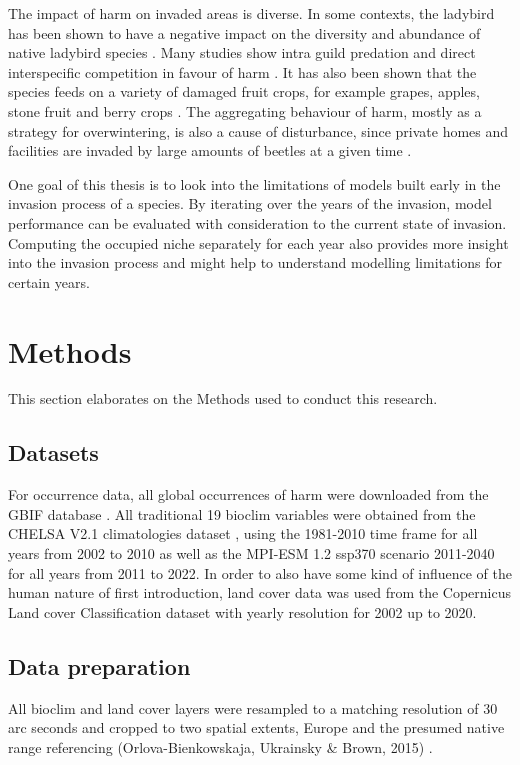 \documentclass[12pt,a4paper]{article}
\begin{document}
The impact of \gls{harm} on invaded areas is diverse.
In some contexts, the ladybird has been shown to have a negative impact on the diversity and abundance of native ladybird species \autocite{roy2016harmonia}.
Many studies show intra guild predation and direct interspecific competition in favour of \gls{harm} \autocite{pell2008harmoniaIGP}.
It has also been shown that the species feeds on a variety of damaged fruit crops, for example grapes, apples, stone fruit and berry crops \autocite{koch2004harmoniafoodcrop}.
The aggregating behaviour of \gls{harm}, mostly as a strategy for overwintering, is also a cause of disturbance, since private homes and facilities are invaded by large amounts of beetles at a given time \autocite{nalepa2005harmoniahomes}.

One goal of this thesis is to look into the limitations of models built early in the invasion process of a species.
By iterating over the years of the invasion, model performance can be evaluated with consideration to the current state of invasion.
Computing the occupied niche separately for each year also provides more insight into the invasion process and might help to understand modelling limitations for certain years.



\newpage
\section{Methods}
This section elaborates on the Methods used to conduct this research.

\subsection{Datasets}
For occurrence data, all global occurrences of \gls{harm} were downloaded from the GBIF database \autocite{GBIFaxyridisdataset}.
All traditional 19 bioclim variables were obtained from the CHELSA V2.1 climatologies dataset \autocite{karger2017CHELSApaper, CHELSAbioclimdataset}, using the 1981-2010 time frame for all years from 2002 to 2010 as well as the MPI-ESM 1.2 ssp370 scenario 2011-2040 for all years from 2011 to 2022.
In order to also have some kind of influence of the human nature of first introduction, land cover data was used from the Copernicus Land cover Classification dataset \autocite{COPlandcoverdataset}  with yearly resolution for 2002 up to 2020.

\subsection{Data preparation}
All bioclim and land cover layers were resampled to a matching resolution of 30 arc seconds and cropped to two spatial extents, Europe and the presumed native range referencing (Orlova-Bienkowskaja, Ukrainsky \& Brown, 2015) \autocite{orlova2015harmonia}.
\end{document}
